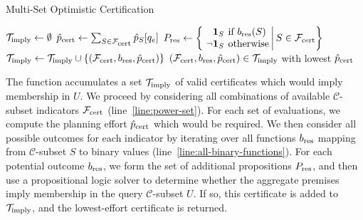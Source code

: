 \begin{algorithm}
\caption{Multi-Set Optimistic Certification}
\label{alg:opt-edge-plan}
\begin{algorithmic}[1]
   \State $\mathcal{T}_{\mbox{\scriptsize imply}} \leftarrow \emptyset$
         \label{line:power-set}
      \State ${\hat p}_{\mbox{\scriptsize cert}} \leftarrow \sum_{S \in \mathcal{F}_{\mbox{\scriptsize cert}}} \hat{p}_S[q_e]$
            \label{line:all-binary-functions}
         \State $\arraycolsep=2pt
            P_{\ms{res}} \leftarrow
            \left\{\left. \begin{array}{rl}
            \mathbf{1}_S & \mbox{if } b_{\ms{res}}(S) \\
            \lnot \mathbf{1}_S & \mbox{otherwise} \\
            \end{array}
            \right|
            S \in \mathcal{F}_{\ms{cert}}
            \right\}$
            \State $\mathcal{T}_{\mbox{\scriptsize imply}} \leftarrow
               \mathcal{T}_{\mbox{\scriptsize imply}} \cup
               \{ (\mathcal{F}_{\mbox{\scriptsize cert}}, b_{\mbox{\scriptsize res}}, {\hat p}_{\mbox{\scriptsize cert}}) \}$
         \EndIf
      \EndFor
   \EndFor
   \State \Return $(\mathcal{F}_{\mbox{\scriptsize cert}}, b_{\mbox{\scriptsize res}}, {\hat p}_{\mbox{\scriptsize cert}})
      \in \mathcal{T}_{\mbox{\scriptsize imply}}$
      with lowest ${\hat p}_{\mbox{\scriptsize cert}}$
\EndFunction
\end{algorithmic}
\end{algorithm}

The function accumulates a set $\mathcal{T}_{\mbox{\scriptsize imply}}$ of
valid certificates which would imply membership in $U$.
We proceed by considering all combinations of
available $\mathcal{C}$-subset indicators
$\mathcal{F}_{\mbox{\scriptsize cert}}$ (line~\ref{line:power-set}).
For each set of evaluations,
we compute the planning effort ${\hat p}_{\mbox{\scriptsize cert}}$
which would be required.
We then consider all possible outcomes for each indicator
by iterating over all functions $b_{\mbox{\scriptsize res}}$ mapping
from $\mathcal{C}$-subset $S$ to binary values
(line~\ref{line:all-binary-functions}).
For each potential outcome $b_{\mbox{\scriptsize res}}$,
we form the set of additional propositions $P_{\mbox{\scriptsize res}}$,
and then use a propositional logic solver to determine whether
the aggregate premises imply membership
in the query $\mathcal{C}$-subset $U$.
If so, this certificate is added to $\mathcal{T}_{\mbox{\scriptsize imply}}$,
and the lowest-effort certificate is returned.

